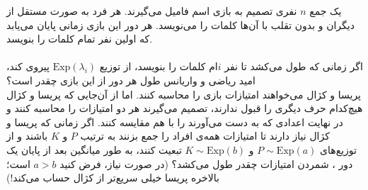 \problem{}
یک جمع \( n \) نفری تصمیم به بازی اسم فامیل می‌گیرند. هر فرد به صورت مستقل از دیگران و بدون تقلب با آن‌ها کلمات را می‌نویسد. هر دور این بازی زمانی پایان می‌یابد که اولین نفر تمام کلمات را بنویسد.
\\
\\
\subproblem{}
اگر زمانی که طول می‌کشد تا نفر \( i \)ام کلمات را بنویسد، از توزیع \( \text{Exp}(\lambda_i) \) پیروی کند، امید ریاضی و واریانس طول هر دور از این بازی چقدر است؟
\\
\subproblem{}
پریسا و کژال می‌خواهند امتیازات بازی را محاسبه کنند. 
اما از آن‌جایی که پریسا و کژال هیچ‌کدام حرف دیگری را قبول ندارند، تصمیم می‌گیرند هر دو امتیازات را
 محاسبه کنند و در نهایت اعدادی که به دست می‌آورند را با هم مقایسه کنند.
اگر زمانی که پریسا و کژال نیاز دارند
 تا امتیازات همه‌ی افراد را جمع بزنند به ترتیب \( P \) و \( K \) باشند و 
 از توزیع‌های \( P \sim \text{Exp}(a) \) و \( K \sim \text{Exp}(b) \) 
 تبعیت کنند، به طور میانگین بعد از پایان یک دور
 ، شمردن امتیازات چقدر طول می‌کشد؟ (در صورت نیاز، فرض کنید \( a > b \)
  است؛ بالاخره پریسا خیلی سریع‌تر از کژال حساب می‌کند!)
